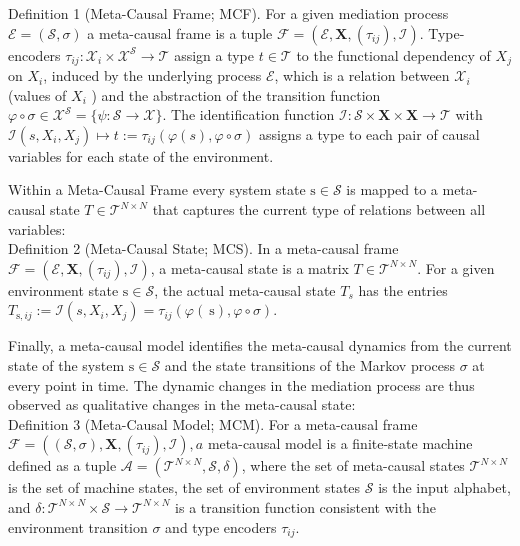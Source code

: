 \documentclass[10pt]{article}
\begin{document}
Definition 1 (Meta-Causal Frame; MCF). For a given mediation process $\mathcal{E}=(\mathcal{S}, \sigma)$ a meta-causal frame is a tuple $\mathcal{F}=\left(\mathcal{E}, \mathbf{X},\left(\tau_{i j}\right), \mathcal{I}\right)$. Type-encoders $\tau_{i j}: \mathcal{X}_{i} \times \mathcal{X}^{\mathcal{S}} \rightarrow \mathcal{T}$ assign a type $t \in \mathcal{T}$ to the functional dependency of $X_{j}$ on $X_{i}$, induced by the underlying process $\mathcal{E}$, which is a relation between $\mathcal{X}_{i}$ (values of $X_{i}$ ) and the abstraction of the transition function $\varphi \circ \sigma \in \mathcal{X}^{\mathcal{S}}=\{\psi: \mathcal{S} \rightarrow \mathcal{X}\}$. The identification function $\mathcal{I}: \mathcal{S} \times \mathbf{X} \times \mathbf{X} \rightarrow \mathcal{T}$ with $\mathcal{I}\left(s, X_{i}, X_{j}\right) \mapsto t:=\tau_{i j}(\varphi(s), \varphi \circ \sigma)$ assigns a type to each pair of causal variables for each state of the environment.

Within a Meta-Causal Frame every system state $\mathrm{s} \in \mathcal{S}$ is mapped to a meta-causal state $T \in \mathcal{T}^{N \times N}$ that captures the current type of relations between all variables:\\
Definition 2 (Meta-Causal State; MCS). In a meta-causal frame $\mathcal{F}=\left(\mathcal{E}, \mathbf{X},\left(\tau_{i j}\right), \mathcal{I}\right)$, a meta-causal state is a matrix $T \in \mathcal{T}^{N \times N}$. For a given environment state $\mathrm{s} \in \mathcal{S}$, the actual meta-causal state $T_{s}$ has the entries $T_{\mathrm{s}, i j}:=\mathcal{I}\left(s, X_{i}, X_{j}\right)=\tau_{i j}(\varphi(\mathrm{~s}), \varphi \circ \sigma)$.

Finally, a meta-causal model identifies the meta-causal dynamics from the current state of the system $\mathrm{s} \in \mathcal{S}$ and the state transitions of the Markov process $\sigma$ at every point in time. The dynamic changes in the mediation process are thus observed as qualitative changes in the meta-causal state:\\
Definition 3 (Meta-Causal Model; MCM). For a meta-causal frame $\mathcal{F}=\left((\mathcal{S}, \sigma), \mathbf{X},\left(\tau_{i j}\right), \mathcal{I}\right), a$ meta-causal model is a finite-state machine defined as a tuple $\mathcal{A}=\left(\mathcal{T}^{N \times N}, \mathcal{S}, \delta\right)$, where the set of meta-causal states $\mathcal{T}^{N \times N}$ is the set of machine states, the set of environment states $\mathcal{S}$ is the input alphabet, and $\delta: \mathcal{T}^{N \times N} \times \mathcal{S} \rightarrow \mathcal{T}^{N \times N}$ is a transition function consistent with the environment transition $\sigma$ and type encoders $\tau_{i j}$.
\end{document}
